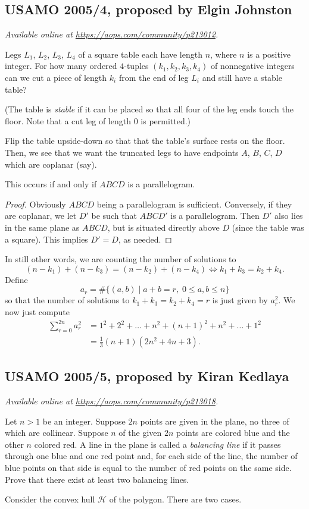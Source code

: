 \documentclass[11pt]{scrartcl}
\begin{document}
\subsection{USAMO 2005/4, proposed by Elgin Johnston}
\textsl{Available online at \url{https://aops.com/community/p213012}.}
\begin{mdframed}[style=mdpurplebox,frametitle={Problem statement}]
Legs $L_1$, $L_2$, $L_3$, $L_4$ of a square table each have length $n$,
where $n$ is a positive integer.
For how many ordered $4$-tuples $(k_1, k_2, k_3, k_4)$ of nonnegative integers
can we cut a piece of length $k_i$ from the end of leg $L_i$
and still have a stable table?

(The table is \emph{stable} if it can be placed
so that all four of the leg ends touch the floor.
Note that a cut leg of length $0$ is permitted.)
\end{mdframed}
Flip the table upside-down so that that the table's surface
rests on the floor.
Then, we see that we want the truncated legs
to have endpoints $A$, $B$, $C$, $D$ which are coplanar (say).
\begin{claim*}
  This occurs if and only if $ABCD$ is a parallelogram.
\end{claim*}
\begin{proof}
  Obviously $ABCD$ being a parallelogram is sufficient.
  Conversely, if they are coplanar,
  we let $D'$ be such that $ABCD'$ is a parallelogram.
  Then $D'$ also lies in the same plane as $ABCD$,
  but is situated directly above $D$
  (since the table was a square).
  This implies $D' = D$, as needed.
\end{proof}
In still other words, we are counting the number of solutions to
\[ (n-k_1) + (n-k_3) = (n-k_2) + (n-k_4)
  \iff k_1 + k_3 = k_2 + k_4. \]
Define
\[ a_r = \# \{(a,b) \mid a+b=r, \; 0 \le a,b \le n \} \]
so that the number of solutions to $k_1 + k_3 = k_2 + k_4 = r$
is just given by $a_r^2$.
We now just compute
\begin{align*}
  \sum_{r=0}^{2n} a_r^2 &= 1^2 + 2^2 + \dots + n^2 + (n+1)^2 + n^2 + \dots + 1^2 \\
  &= \frac{1}{3}(n+1)(2n^2 + 4n + 3).
\end{align*}
\pagebreak

\subsection{USAMO 2005/5, proposed by Kiran Kedlaya}
\textsl{Available online at \url{https://aops.com/community/p213018}.}
\begin{mdframed}[style=mdpurplebox,frametitle={Problem statement}]
Let $n > 1$ be an integer.
Suppose $2n$ points are given in the plane,
no three of which are collinear.
Suppose $n$ of the given $2n$ points are colored blue
and the other $n$ colored red.
A line in the plane is called a \emph{balancing line}
if it passes through one blue and one red point
and, for each side of the line, the number of blue points on that
side is equal to the number of red points on the same side.
Prove that there exist at least two balancing lines.
\end{mdframed}
Consider the convex hull $\mathcal H$ of the polygon.
There are two cases.
\end{document}
